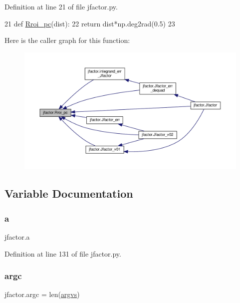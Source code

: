 Definition at line 21 of file jfactor.\+py.


\begin{DoxyCode}
21 \textcolor{keyword}{def }\hyperlink{namespacejfactor_ae5aad7f2ac90b82740c027677d7f4ac7}{Rroi\_pc}(dist):
22     \textcolor{keywordflow}{return} dist*np.deg2rad(0.5)
23 
\end{DoxyCode}
Here is the caller graph for this function\+:\nopagebreak
\begin{figure}[H]
\begin{center}
\leavevmode
\includegraphics[width=350pt]{de/d47/namespacejfactor_ae5aad7f2ac90b82740c027677d7f4ac7_icgraph}
\end{center}
\end{figure}


\subsection{Variable Documentation}
\mbox{\label{namespacejfactor_ab5ce4a1ef962b5f938f157d0abc69a20}} 
\subsubsection{\texorpdfstring{a}{a}}
{\footnotesize\ttfamily jfactor.\+a}



Definition at line 131 of file jfactor.\+py.

\mbox{\label{namespacejfactor_a7ec02594672c6b2a0a519df5a7648ce2}} 
\subsubsection{\texorpdfstring{argc}{argc}}
{\footnotesize\ttfamily jfactor.\+argc = len(\hyperlink{namespacejfactor_a2f38906b89281fb8e6cdc4cbc9c8735e}{argvs})}



